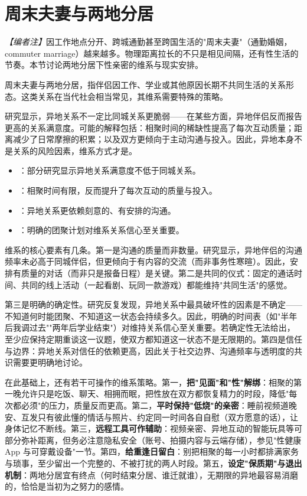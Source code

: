 \section{周末夫妻与两地分居}
\noindent\textit{【编者注】}因工作地点分开、跨城通勤甚至跨国生活的"周末夫妻"（通勤婚姻，commuter marriage）越来越多。物理距离拉长的不只是相见间隔，还有性生活的节奏。本节讨论两地分居下性亲密的维系与现实安排。

周末夫妻与两地分居，指伴侣因工作、学业或其他原因长期不共同生活的关系形态。这类关系在当代社会相当常见，其维系需要特殊的策略。

研究显示，异地关系不一定比同城关系更脆弱——在某些方面，异地伴侣反而报告更高的关系满意度。可能的解释包括：相聚时间的稀缺性提高了每次互动质量；距离减少了日常摩擦的积累；以及双方更倾向于主动沟通与投入。因此，异地本身不是关系的风险因素，维系方式才是。

\begin{itemize}
  \item {}：部分研究显示异地关系满意度不低于同城关系。
  \item {}：相聚时间有限，反而提升了每次互动的质量与投入。
  \item {}：异地关系更依赖刻意的、有安排的沟通。
  \item {}：明确的团聚计划对维系关系信心至关重要。
\end{itemize}

维系的核心要素有几条。第一是沟通的质量而非数量。研究显示，异地伴侣的沟通频率未必高于同城伴侣，但更倾向于有内容的交流（而非事务性寒暄）。因此，安排有质量的对话（而非只是报备日程）是关键。第二是共同的仪式：固定的通话时间、共同的线上活动（一起看剧、玩同一款游戏）都能维持"共同生活"的感觉。

第三是明确的确定性。研究反复发现，异地关系中最具破坏性的因素是不确定——不知道何时能团聚、不知道这一状态会持续多久。因此，明确的时间表（如"半年后我调过去""两年后学业结束"）对维持关系信心至关重要。若确定性无法给出，至少应保持定期重谈这一议题，使双方都知道这一状态不是无限期的。第四是信任与边界：异地关系对信任的依赖更高，因此关于社交边界、沟通频率与透明度的共识需要更明确地讨论。

在此基础上，还有若干可操作的维系策略。第一，\textbf{把"见面"和"性"解绑}：相聚的第一晚允许只是吃饭、聊天、相拥而眠，把性放在双方都恢复精力的时段，降低"每次都必须"的压力，质量反而更高。第二，\textbf{平时保持"低烧"的亲密}：睡前视频道晚安、互发只有彼此懂的情话与照片、约定同一时间各自自慰（双方愿意的话），让身体记忆不断线。第三，\textbf{远程工具可作辅助}：视频亲密、异地互动的智能玩具等可部分弥补距离，但务必注意隐私安全（账号、拍摄内容与云端存储），参见"性健康 App 与可穿戴设备"一节。第四，\textbf{给重逢日留白}：别把相聚的每一小时都排满家务与琐事，至少留出一个完整的、不被打扰的两人时段。第五，\textbf{设定"保质期"与退出机制}：两地分居宜有终点（何时结束分居、谁迁就谁），无期限的异地最容易消磨的，恰恰是当初为之努力的感情。

